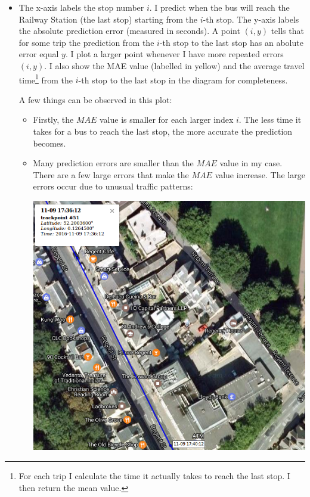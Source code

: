\documentclass[12pt,a4paper,oneside,openright]{report}
\begin{document}
\begin{itemize}

\item[]
   The x-axis labels the stop number $i$. I predict when the bus
   will reach the Railway Station (the last stop) starting from the $i$-th stop.
   The y-axis labels the absolute prediction error (measured in seconds).
   A point $(i, y)$ tells that for some trip the prediction from the $i$-th stop
   to the last stop has an abolute error equal $y$. I plot a larger point whenever
   I have more repeated errors $(i, y)$. I also show the MAE value (labelled in yellow) and the 
   average travel time\footnote{For each trip I calculate the time it actually
   takes to reach the last stop. I then return the mean value.} from the $i$-th stop
   to the last stop in the diagram for completeness.

   A few things can be observed in this plot:
   
\begin{itemize} 
   
   \item 
   Firstly, the $MAE$ value is smaller
   for each larger index $i$. The less time it takes for a bus to reach the last
   stop, the more accurate the prediction becomes.

   \item
   Many prediction errors are smaller than the $MAE$ value in my case.
   There are a few large errors that make the $MAE$ value increase. The large errors
   occur due to unusual traffic patterns:

   \includegraphics[scale=0.6]{figs/unusual_pattern.png} \\


\end{itemize}
\end{itemize}
\end{document}
